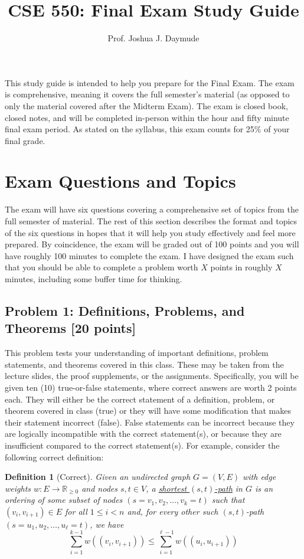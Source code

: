 \documentclass[10pt]{article}
\title{\large{\textbf{CSE 550: Final Exam Study Guide}}}
\author{Prof. Joshua J. Daymude}
\date{}
\newtheorem*{definition}{Definition}
\begin{document}
\maketitle

\thispagestyle{firststyle}

This study guide is intended to help you prepare for the Final Exam.
The exam is comprehensive, meaning it covers the full semester's material (as opposed to only the material covered after the Midterm Exam).
The exam is closed book, closed notes, and will be completed in-person within the hour and fifty minute final exam period.
As stated on the syllabus, this exam counts for 25\% of your final grade.

\section{Exam Questions and Topics}

The exam will have six questions covering a comprehensive set of topics from the full semester of material.
The rest of this section describes the format and topics of the six questions in hopes that it will help you study effectively and feel more prepared.
By coincidence, the exam will be graded out of 100 points and you will have roughly 100 minutes to complete the exam.
I have designed the exam such that you should be able to complete a problem worth $X$ points in roughly $X$ minutes, including some buffer time for thinking.

\subsection{Problem 1: Definitions, Problems, and Theorems [20 points]}

This problem tests your understanding of important definitions, problem statements, and theorems covered in this class.
These may be taken from the lecture slides, the proof supplements, or the assignments.
Specifically, you will be given ten (10) true-or-false statements, where correct answers are worth 2 points each.
They will either be the correct statement of a definition, problem, or theorem covered in class (true) or they will have some modification that makes their statement incorrect (false).
False statements can be incorrect because they are logically incompatible with the correct statement(s), or because they are insufficient compared to the correct statement(s).
For example, consider the following correct definition:

\begin{definition}[Correct]
Given an undirected graph $G = (V, E)$ with edge weights $w : E \to \mathbb{R}_{\geq 0}$ and nodes $s, t \in V$, a \underline{shortest $(s,t)$-path} in $G$ is an ordering of some subset of nodes $(s = v_1, v_2, \ldots, v_k = t)$ such that $(v_i, v_{i+1}) \in E$ for all $1 \leq i < n$ and, for every other such $(s,t)$-path $(s = u_1, u_2, \ldots, u_\ell = t)$, we have
\[\sum_{i=1}^{k-1} w((v_i, v_{i+1})) \leq \sum_{i=1}^{\ell - 1} w((u_i, u_{i+1}))\]
\end{definition}
\end{document}
